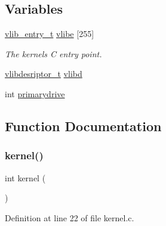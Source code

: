 \subsection*{Variables}
\begin{DoxyCompactItemize}
\item 
\hyperlink{a00200_a97c1a7136f2ab06368e93c2d7533d619_a97c1a7136f2ab06368e93c2d7533d619}{vlib\+\_\+entry\+\_\+t} \hyperlink{a00068_af69f4f709fdab28dec6b8fb75fb4d526_af69f4f709fdab28dec6b8fb75fb4d526}{vlibe} \mbox{[}255\mbox{]}
\begin{DoxyCompactList}\small\item\em The kernels C entry point. \end{DoxyCompactList}\item 
\hyperlink{a00200_a2d9000b4fbb25c5ed2950a2d8f4921d5_a2d9000b4fbb25c5ed2950a2d8f4921d5}{vlibdesriptor\+\_\+t} \hyperlink{a00068_a2125beec541d04796805161dbec05fcf_a2125beec541d04796805161dbec05fcf}{vlibd}
\item 
int \hyperlink{a00068_af37cb131d8a2101addfbf5fb2d8a53b4_af37cb131d8a2101addfbf5fb2d8a53b4}{primarydrive}
\end{DoxyCompactItemize}


\subsection{Function Documentation}
\mbox{\label{a00068_a4ee3d1f05046b7afc6b4d516bf10667a_a4ee3d1f05046b7afc6b4d516bf10667a}} 
\subsubsection{\texorpdfstring{kernel()}{kernel()}}
{\footnotesize\ttfamily int kernel (\begin{DoxyParamCaption}{ }\end{DoxyParamCaption})}



Definition at line 22 of file kernel.\+c.


